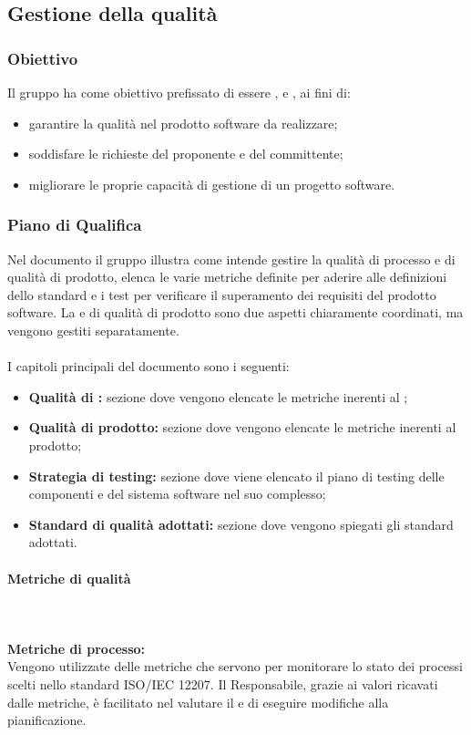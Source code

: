 \subsection{Gestione della qualità}
\subsubsection{Obiettivo}
Il gruppo \Gruppo{} ha come obiettivo prefissato di essere ,  e , ai fini di:
\begin{itemize}
    \item garantire la qualità nel prodotto software da realizzare;
    \item soddisfare le richieste del proponente e del committente;
    \item migliorare le proprie capacità di gestione di un progetto software.
\end{itemize}

\subsubsection{Piano di Qualifica}
Nel documento \PdQ il gruppo \Gruppo{} illustra come intende gestire la qualità di processo e di qualità di prodotto, elenca le varie metriche definite per aderire alle definizioni dello standard e i test per verificare il superamento dei requisiti del prodotto software.
La  e di qualità di prodotto sono due aspetti chiaramente coordinati, ma vengono gestiti separatamente. \\ \\
I capitoli principali del documento sono i seguenti:
\begin{itemize}
    \item \textbf{Qualità di :} sezione dove vengono elencate le metriche inerenti al ;
    \item \textbf{Qualità di prodotto:} sezione dove vengono elencate le metriche inerenti al prodotto;
    \item \textbf{Strategia di testing:} sezione dove viene elencato il piano di testing delle componenti e del sistema software nel suo complesso;
    \item \textbf{Standard di qualità adottati:} sezione dove vengono spiegati gli standard adottati.
\end{itemize}

\paragraph{Metriche di qualità}\mbox{}\\ \\
\textbf{Metriche di processo:}\\
Vengono utilizzate delle metriche che servono per monitorare lo stato dei processi scelti nello standard ISO/IEC 12207. Il Responsabile, grazie ai valori ricavati dalle metriche, è facilitato nel
valutare il  e di eseguire modifiche alla pianificazione.\\

